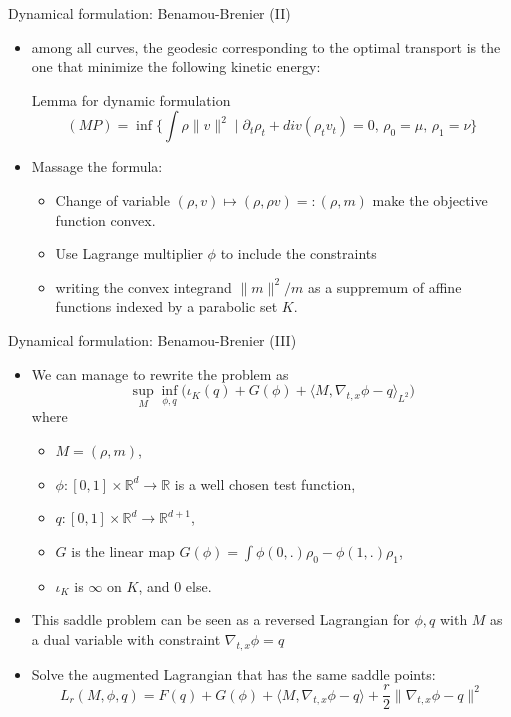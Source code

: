 \documentclass{beamer}
\newcommand{\R}{\mathbb{R}}
\newcommand{\ps}[2]{\langle#1,#2\rangle}
\begin{document}
\begin{frame}{Dynamical formulation: Benamou-Brenier (II)}
    \begin{itemize}
        \item among all curves, the geodesic corresponding to the optimal transport is the one that minimize the following kinetic energy:
        \begin{alertblock}{Lemma for dynamic formulation}
        $$(MP) = \inf \bigg\{ \int\rho\|v\|^2 \;\bigg|\; \partial_t\rho_t + div(\rho_tv_t) = 0 ,\, \rho_0=\mu,\, \rho_1=\nu \bigg\} $$
        \end{alertblock}
        \item Massage the formula:
        \begin{itemize}
        \item Change of variable 
        $(\rho,v)\mapsto(\rho ,\rho v)=:(\rho,m)$ make the objective function convex.
        \item Use Lagrange multiplier $\phi$ to include the constraints
        \item writing the convex integrand $\|m\|^2/m$ as a suppremum of affine functions indexed by a parabolic set $K$.
        \end{itemize}
        \end{itemize}
        \end{frame}
        
\begin{frame}{Dynamical formulation: Benamou-Brenier (III)}
    \begin{itemize}
       \item We can manage to rewrite the problem as
        $$\sup_{M}\inf_{\phi,q} \big(\iota_K(q) + G(\phi) +\ps{M}{\nabla_{t,x}\phi-q}_{L^2}\big)$$
        where
        \begin{itemize}
           \item $M=(\rho,m)$,
           \item $\phi:[0,1]\times\R^d\to\R$ is a well chosen test function,
           \item $q:[0,1]\times\R^d\to\R^{d+1}$,
           \item $G$ is the linear map 
           $G(\phi) = \int\phi(0,.)\rho_0-\phi(1,.)\rho_1$,
           \item $\iota_K$ is $\infty$ on $K$, and 0 else. 
       \end{itemize}
       \item This saddle problem can be seen as a reversed Lagrangian for $\phi,q$ with $M$ as a dual variable with constraint $\nabla_{t,x}\phi=q$
       \item Solve the augmented Lagrangian that has the same saddle points:
       $$ L_r(M,\phi,q) = F(q) + G(\phi) +\ps{M}{\nabla_{t,x}\phi-q} + \frac{r}{2}\|\nabla_{t,x}\phi-q\|^2$$
    \end{itemize}
\end{frame}
\end{document}
